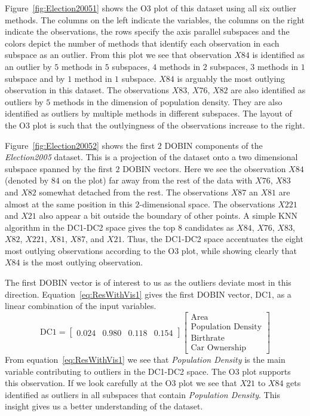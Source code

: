 \documentclass[letter,12pt]{article}
\begin{document}
Figure~\ref{fig:Election20051} shows the O3 plot of this dataset using all six outlier methods. The columns on the left indicate the variables, the columns on the right indicate the observations, the rows specify the axis parallel subspaces and the colors depict the number of methods that identify each observation in each subspace as an outlier. From this plot we see that observation $X84$ is identified as an outlier by $5$ methods in $5$ subspaces, $4$ methods in $2$ subspaces, $3$ methods in $1$ subspace and by $1$ method in $1$ subspace. $X84$ is arguably the most outlying observation in this dataset. The observations $X83$, $X76$, $X82$ are also identified as outliers by $5$ methods in the dimension of population density. They are also identified as outliers by multiple methods in different subspaces. The layout of the O3 plot is such that the outlyingness of the observations increase to the right.

Figure~\ref{fig:Election20052} shows the first $2$ DOBIN components of the \textit{Election2005} dataset. This is a projection of the dataset onto a two dimensional subspace spanned by the first $2$ DOBIN vectors. Here we see the observation $X84$ (denoted by $84$ on the plot) far away from the rest of the data with $X76$, $X83$ and $X82$ somewhat detached from the rest. The observations $X87$ an $X81$ are almost at the same position in this $2$-dimensional space. The observations $X221$ and $X21$ also appear a bit outside the boundary of other points. A simple KNN algorithm in the DC1-DC2 space gives the top $8$ candidates as $X84$, $X76$, $X83$, $X82$, $X221$, $X81$, $X87$, and $X21$. Thus, the DC1-DC2 space accentuates the eight most outlying observations according to the O3 plot, while showing clearly that $X84$ is the most outlying observation.

The first DOBIN vector is of interest to us as the outliers deviate most in this direction. Equation~\eqref{eq:ResWithVis1} gives the first DOBIN vector, DC1, as a linear combination of the input variables.
{\color{blue}
\begin{equation}\label{eq:ResWithVis1}
	\text{DC1} = \begin{bmatrix}
		0.024 & 0.980 & 0.118 & 0.154
	\end{bmatrix}
	\begin{bmatrix}
		\text{Area}               \\
		\text{Population Density} \\
		\text{Birthrate}          \\
		\text{Car Ownership}
	\end{bmatrix}
\end{equation}}
From equation~\eqref{eq:ResWithVis1} we see that \textit{Population Density} is the main variable contributing to outliers in the DC1-DC2 space. The O3 plot supports this observation. If we look carefully at the O3 plot we see that $X21$ to $X84$ gets identified as outliers in all subspaces that contain \textit{Population Density}. This insight gives us a better understanding of the dataset.
\end{document}
